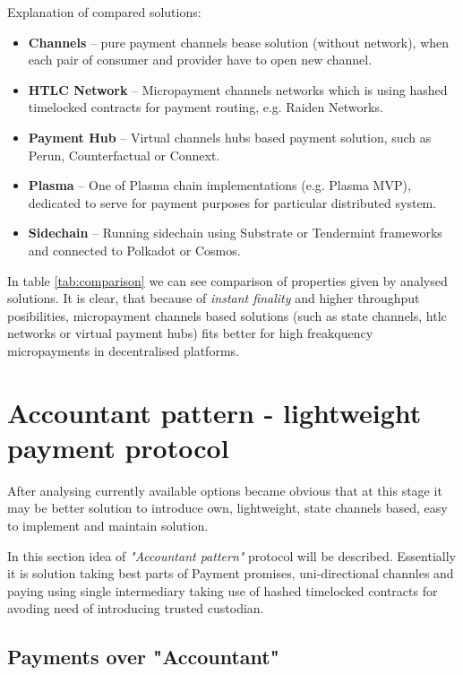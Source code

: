 \documentclass[a4paper,12pt]{article}
\begin{document}
Explanation of compared solutions:

\begin{itemize}
    \item \textbf{Channels} -- pure payment channels bease solution (without 
    network), when each pair of consumer and provider have to open new channel.
    \item \textbf{HTLC Network} -- Micropayment channels networks which is using
    hashed timelocked contracts for payment routing, e.g. Raiden Networks.
    \item \textbf{Payment Hub} -- Virtual channels hubs based payment solution,
    such as Perun, Counterfactual or Connext.
    \item \textbf{Plasma} -- One of Plasma chain implementations (e.g. Plasma 
    MVP), dedicated to serve for payment purposes for particular distributed
    system.
    \item \textbf{Sidechain} -- Running sidechain using Substrate or Tendermint
    frameworks and connected to Polkadot or Cosmos.
\end{itemize}

In table \ref{tab:comparison} we can see comparison of properties given by 
analysed solutions. It is clear, that because of \textit{instant finality} and 
higher throughput posibilities, micropayment channels based solutions (such as
state channels, htlc networks or virtual payment hubs) fits better for high 
freakquency micropayments in decentralised platforms.

\section{Accountant pattern - lightweight payment protocol}

After analysing currently available options became obvious that at this stage
it may be better solution to introduce own, lightweight, state channels based,
easy to implement and maintain solution. 

In this section idea of \textit{"Accountant pattern"} protocol will be 
described. Essentially it is solution taking best parts of Payment promises,
uni-directional channles and paying using single intermediary taking use of 
hashed timelocked contracts for avoding need of introducing trusted custodian.

\subsection{Payments over "Accountant"}
\end{document}
